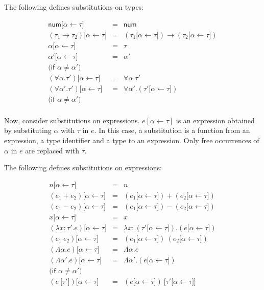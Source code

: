 The following defines substitutions on types:

\[
\begin{array}{rcl}
\textsf{num} \lbrack\alpha\leftarrow\tau\rbrack &=& \textsf{num} \\
(\tau_1\rightarrow\tau_2) \lbrack\alpha\leftarrow\tau\rbrack &=&
(\tau_1
\lbrack\alpha\leftarrow\tau\rbrack)\rightarrow(\tau_2\lbrack\alpha\leftarrow\tau\rbrack)
\\
\alpha \lbrack\alpha\leftarrow\tau\rbrack &=& \tau \\
\alpha' \lbrack\alpha\leftarrow\tau\rbrack &=& \alpha'\\
\textsf{(if } \alpha\not=\alpha'\textsf{)} \\
(\forall\alpha.\tau') \lbrack\alpha\leftarrow\tau\rbrack &=& \forall\alpha.\tau'
\\
(\forall\alpha'.\tau') \lbrack\alpha\leftarrow\tau\rbrack &=&
\forall\alpha'.(\tau'\lbrack\alpha\leftarrow\tau\rbrack) \\
\textsf{(if } \alpha\not=\alpha'\textsf{)} \\
\end{array}
\]

Now, consider substitutions on expressions. $e[\alpha\leftarrow\tau]$ is an
expression obtained by substituting $\alpha$ with $\tau$ in $e$. In this
case, a substitution is a function from an expression, a type identifier and a
type to an expression. Only free occurrences of $\alpha$ in $e$ are replaced
with $\tau$.

The following defines substitutions on expressions:

\[
\begin{array}{rcl}
n \lbrack\alpha\leftarrow\tau\rbrack &=& n \\
(e_1+e_2) \lbrack\alpha\leftarrow\tau\rbrack &=&
(e_1\lbrack\alpha\leftarrow\tau\rbrack) + (e_2\lbrack\alpha\leftarrow\tau\rbrack)
\\
(e_1-e_2) \lbrack\alpha\leftarrow\tau\rbrack &=&
(e_1\lbrack\alpha\leftarrow\tau\rbrack) - (e_2\lbrack\alpha\leftarrow\tau\rbrack)
\\
x \lbrack\alpha\leftarrow\tau\rbrack &=& x \\
(\lambda x:\tau'.e) \lbrack\alpha\leftarrow\tau\rbrack &=&
\lambda
x:(\tau'\lbrack\alpha\leftarrow\tau\rbrack).(e\lbrack\alpha\leftarrow\tau\rbrack)
\\
(e_1\ e_2) \lbrack\alpha\leftarrow\tau\rbrack &=&
(e_1\lbrack\alpha\leftarrow\tau\rbrack)\ (e_2\lbrack\alpha\leftarrow\tau\rbrack)
\\
(\Lambda\alpha.e)\lbrack\alpha\leftarrow\tau\rbrack &=& \Lambda\alpha.e \\
(\Lambda\alpha'.e)\lbrack\alpha\leftarrow\tau\rbrack &=&
\Lambda\alpha'.(e\lbrack\alpha\leftarrow\tau\rbrack)\\
\textsf{(if } \alpha\not=\alpha'\textsf{)} \\
(e\ \lbrack\tau'\rbrack)\lbrack\alpha\leftarrow\tau\rbrack &=&
(e\lbrack\alpha\leftarrow\tau\rbrack)\ \lbrack
\tau'\lbrack\alpha\leftarrow\tau\rbrack\rbrack \\
\end{array}
\]

